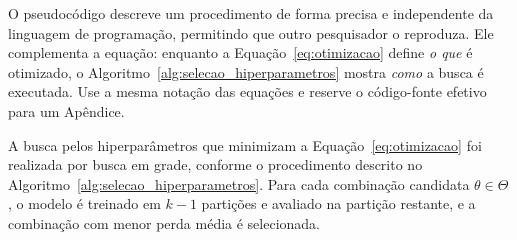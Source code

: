 \begin{orientacao}
  O pseudocódigo descreve um procedimento de forma precisa e independente da linguagem de programação, permitindo que outro pesquisador o reproduza. Ele complementa a equação: enquanto a Equação~\eqref{eq:otimizacao} define \emph{o que} é otimizado, o Algoritmo~\ref{alg:selecao_hiperparametros} mostra \emph{como} a busca é executada. Use a mesma notação das equações e reserve o código-fonte efetivo para um Apêndice.
\end{orientacao}

A busca pelos hiperparâmetros que minimizam a Equação~\eqref{eq:otimizacao} foi realizada por busca em grade, conforme o procedimento descrito no Algoritmo~\ref{alg:selecao_hiperparametros}. Para cada combinação candidata $\theta \in \Theta$, o modelo é treinado em $k-1$ partições e avaliado na partição restante, e a combinação com menor perda média é selecionada.

